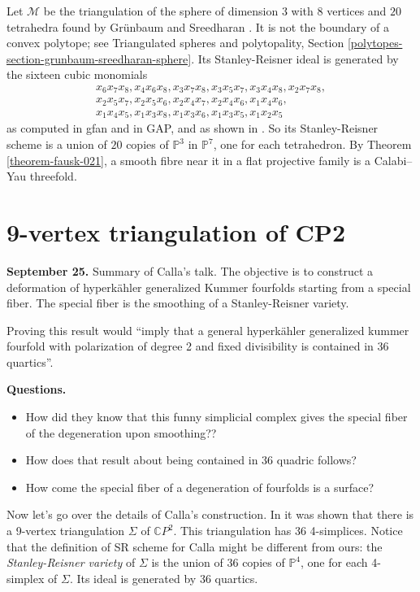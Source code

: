 \noindent
Let $\mathcal{M}$ be the triangulation of the
sphere of dimension $3$ with $8$ vertices and
$20$ tetrahedra found by Grünbaum and
Sreedharan \cite{gru}. It is not the boundary
of a convex polytope; see Triangulated
spheres and polytopality, Section
\ref{polytopes-section-grunbaum-sreedharan-sphere}.
Its Stanley-Reisner ideal is generated by the
sixteen cubic monomials
$$
\begin{aligned}
x_6x_7x_8,
x_4x_6x_8, x_3x_7x_8, x_3x_5x_7, x_3x_4x_8,
x_2x_7x_8, \\ 
x_2x_5x_7, x_2x_5x_6,
x_2x_4x_7, x_2x_4x_6, x_1x_4x_6,\\ 
x_1x_4x_5,
x_1x_3x_8, x_1x_3x_6, x_1x_3x_5, x_1x_2x_5
\end{aligned}
$$
as computed in gfan and in GAP, and as shown
in \cite{luk1}. So its Stanley-Reisner scheme
is a union of $20$ copies of $\mathbb{P}^3$
in $\mathbb{P}^7$, one for each tetrahedron.
By Theorem \ref{theorem-fausk-021}, a smooth
fibre near it in a flat projective family is
a Calabi--Yau threefold.

\section{9-vertex triangulation of CP2}
\label{section-9-vertex-triangulation-of-cp2}



\medskip\noindent
{\bf September 25.}
Summary of Calla's talk.
The objective is to construct a deformation 
of hyperkähler generalized Kummer fourfolds
starting from a special fiber.
The special fiber is the smoothing
of a Stanley-Reisner variety.

Proving this result would 
``imply that a general hyperkähler generalized kummer
fourfold with polarization of degree 2 and fixed divisibility
is contained in 36 quartics''.

\noindent
{\bf Questions.}
\begin{itemize}
\item How did they know that this funny simplicial
complex gives the special fiber of the degeneration
upon smoothing??
\item How does that result about being contained
in 36 quadric follows?
\item How come the special fiber of a degeneration
of fourfolds is a surface?
\end{itemize}

\medskip\noindent
Now let's go over the details of Calla's construction.
In \cite{KuhnelBanchoff1983} it was shown that there is a 9-vertex
triangulation $\Sigma$ of $\mathbb{C}P^2$.
This triangulation has 36 4-simplices.
Notice that the definition of SR scheme for Calla
might be different from ours: the {\it Stanley-Reisner variety}
of $\Sigma$ is the union of 36 copies of $\mathbb{P}^4$,
one for each 4-simplex of $\Sigma$.
Its ideal is generated by 36 quartics.

